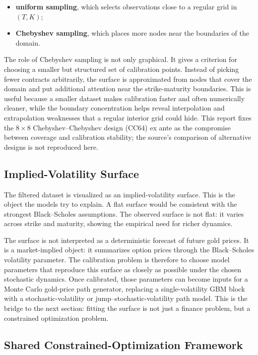 \begin{itemize}[leftmargin=8mm, itemsep=2pt]
    \item \textbf{uniform sampling}, which selects observations close to a regular grid in \((T,K)\);
    \item \textbf{Chebyshev sampling}, which places more nodes near the boundaries of the domain.
\end{itemize}

The role of Chebyshev sampling is not only graphical. It gives a criterion for choosing a smaller but structured set of calibration points. Instead of picking fewer contracts arbitrarily, the surface is approximated from nodes that cover the domain and put additional attention near the strike-maturity boundaries. This is useful because a smaller dataset makes calibration faster and often numerically cleaner, while the boundary concentration helps reveal interpolation and extrapolation weaknesses that a regular interior grid could hide. This report fixes the $8\times8$ Chebyshev--Chebyshev design (CC64) ex ante as the compromise between coverage and calibration stability; the source's comparison of alternative designs is not reproduced here.

\subsection{Implied-Volatility Surface}
\label{sec:iv-surface}

The filtered dataset is visualized as an implied-volatility surface. This is the object the models try to explain. A flat surface would be consistent with the strongest Black--Scholes assumptions. The observed surface is not flat: it varies across strike and maturity, showing the empirical need for richer dynamics.


The surface is not interpreted as a deterministic forecast of future gold prices. It is a market-implied object: it summarizes option prices through the Black--Scholes volatility parameter. The calibration problem is therefore to choose model parameters that reproduce this surface as closely as possible under the chosen stochastic dynamics. Once calibrated, those parameters can become inputs for a Monte Carlo gold-price path generator, replacing a single-volatility GBM block with a stochastic-volatility or jump--stochastic-volatility path model. This is the bridge to the next section: fitting the surface is not just a finance problem, but a constrained optimization problem.

\subsection{Shared Constrained-Optimization Framework}

